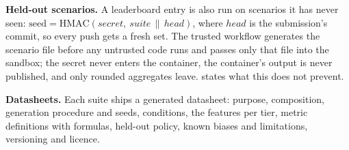 \textbf{Held-out scenarios.} A leaderboard entry is also run on scenarios it has never seen:
\(\mathrm{seed} = \mathrm{HMAC}(\mathit{secret},\ \mathit{suite} \,\|\, \mathit{head})\), where
\(\mathit{head}\) is the submission's commit, so every push gets a fresh set. The trusted
workflow generates the scenario file before any untrusted code runs and passes only that file
into the sandbox; the secret never enters the container, the container's output is never
published, and only rounded aggregates leave.  states what this does not
prevent.

\textbf{Datasheets.} Each suite ships a generated datasheet: purpose, composition, generation
procedure and seeds, conditions, the features per tier, metric definitions with formulas,
held-out policy, known biases and limitations, versioning and licence.

